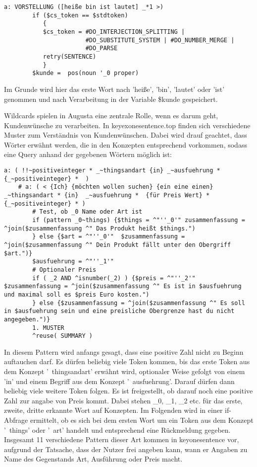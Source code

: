 \begin{lstlisting}[caption={Regel in introductions.top}]
a: VORSTELLUNG ([heiße bin ist lautet] _*1 >)
	    if ($cs_token == $stdtoken)
           {
           $cs_token = #DO_INTERJECTION_SPLITTING |
                       #DO_SUBSTITUTE_SYSTEM | #DO_NUMBER_MERGE |
                       #DO_PARSE
           retry(SENTENCE)
           }
        $kunde =  pos(noun '_0 proper)
\end{lstlisting}

Im Grunde wird hier das erste Wort nach 'heiße', 'bin', 'lautet' oder 'ist' genommen und nach Verarbeitung in der Variable \$kunde gespeichert. 

Wildcards spielen in Augusta eine zentrale Rolle, wenn es darum geht, Kundenwünsche zu verarbeiten. In keyexonesentence.top finden sich verschiedene Muster zum Verständnis von Kundenwünschen. Dabei wird drauf geachtet, dass Wörter erwähnt werden, die in den Konzepten entsprechend vorkommen, sodass eine Query anhand der gegebenen Wörtern möglich ist: 

\begin{lstlisting}[caption={Muster 1 in keyexonesentence.top}]
    a: ( !!~positiveinteger * _~thingsandart {in} _~ausfuehrung * {_~positiveinteger} *  )
    # a: ( < {Ich} {möchten wollen suchen} {ein eine einen} _~thingsandart * {in}  _~ausfuehrung *  {für Preis Wert} * {_~positiveinteger} * )
        # Test, ob _0 Name oder Art ist
        if (pattern _0~things) {$things = ^"''_0'" zusammenfassung = ^join($zusammenfassung ^" Das Produkt heißt $things.")
        } else {$art = ^"''_0'"  $zusammenfassung = ^join($zusammenfassung ^" Dein Produkt fällt unter den Obergriff $art.")}
        $ausfuehrung = ^"''_1'"
        # Optionaler Preis
        if ( _2 AND ^isnumber(_2) ) {$preis = ^"''_2'" $zusammenfassung = ^join($zusammenfassung ^" Es ist in $ausfuehrung und maximal soll es $preis Euro kosten.")
        } else {$zusammenfassung = ^join($zusammenfassung ^" Es soll in $ausfuehrung sein und eine preisliche Obergrenze hast du nicht angegeben.")}
        1. MUSTER
        ^reuse( SUMMARY )
\end{lstlisting}
        
In diesem Pattern wird anfangs gesagt, dass eine positive Zahl nicht zu Beginn auftauchen darf. Es dürfen beliebig viele Token kommen, bis das erste Token aus dem Konzept '~thingsandart' erwähnt wird, optionaler Weise gefolgt von einem 'in' und einem Begriff aus dem Konzept '~ausfuehrung'. Darauf dürfen dann beliebig viele weitere Token folgen. Es ist freigestellt, ob darauf noch eine positive Zahl zur angabe von Preis kommt. Dabei stehen \_0, \_1, \_2 etc. für das erste, zweite, dritte erkannte Wort auf Konzepten. Im Folgenden wird in einer if-Abfrage ermittelt, ob es sich bei dem ersten Wort um ein Token aus dem Konzept '~things' oder '~art' handelt und entsprechend eine Rückmeldung gegeben. 
Insgesamt 11 verschiedene Pattern dieser Art kommen in keyonesentence vor, aufgrund der Tatsache, dass der Nutzer frei angeben kann, wann er Angaben zu Name des Gegenstands Art, Ausführung oder Preis macht. 


